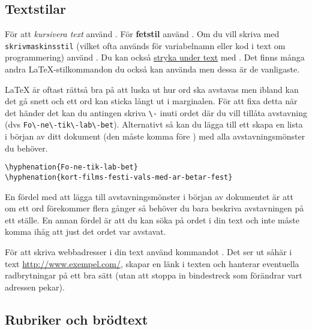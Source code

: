

\subsection{Textstilar}

För att \emph{kursivera text} använd . För \textbf{fetstil}
använd . Om du vill skriva med \texttt{skriv\-maskins\-stil}
(vilket ofta används för variabelnamn eller kod i text om programmering) använd
. Du kan också \underline{stryka under text} med
. Det finns många andra \LaTeX{}-stilkommandon du också
kan använda men dessa är de vanligaste.

\LaTeX{} är oftast rättså bra på att luska ut hur ord ska avstavas men ibland
kan det gå snett och ett ord kan sticka långt ut i marginalen. För att fixa
detta när det händer det kan du antingen skriva \verb|\-| inuti ordet där du
vill tillåta avstavning (dvs \verb|Fo\-ne\-tik\-lab\-bet|). Alternativt så kan
du lägga till ett skapa en lista i början av ditt dokument (den måste komma
före \verb||) med alla avstavningsmönster du behöver.

\begin{verbatim}
\hyphenation{Fo-ne-tik-lab-bet}
\hyphenation{kort-films-festi-vals-med-ar-betar-fest}
\end{verbatim}

En fördel med att lägga till avstavningsmönster i början av dokumentet är att
om ett ord förekommer flera gånger så behöver du bara beskriva avstavningen på
ett ställe. En annan fördel är att du kan söka på ordet i din text och inte
måste komma ihåg att just det ordet var avstavat.

För att skriva webbadresser i din text använd kommandot . Det
ser ut såhär i text \url{http://www.exempel.com/}, skapar en länk i texten och
hanterar eventuella radbrytningar på ett bra sätt (utan att stoppa in
bindestreck som förändrar vart adressen pekar).


\subsection{Rubriker och brödtext}

